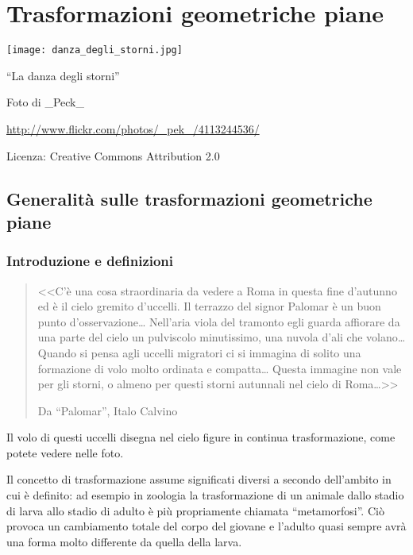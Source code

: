 \chapter{Trasformazioni geometriche piane}

\texttt{[image: danza\_degli\_storni.jpg]}
  \begin{center}
    {\large ``La danza degli storni''}\par
    Foto di \_Peck\_\par
    \url{http://www.flickr.com/photos/_pek_/4113244536/}\par
    Licenza: Creative Commons Attribution 2.0\par
  \end{center}
\newpage


\section{Generalità sulle trasformazioni geometriche piane}

\subsection{Introduzione e definizioni}

\begin{quote}
<<C'è una cosa straordinaria da vedere a Roma in questa fine d'autunno ed è il cielo gremito d'uccelli. Il terrazzo del signor Palomar è un buon punto d'osservazione\ldots{} Nell'aria viola del tramonto egli guarda affiorare da una parte del cielo un pulviscolo minutissimo, una nuvola d'ali che volano\ldots{} Quando si pensa agli uccelli migratori ci si immagina di solito una formazione di volo molto ordinata e compatta\ldots{} Questa immagine non vale per gli storni, o almeno per questi storni autunnali nel cielo di Roma\ldots{}>>

\hfill{}Da ``Palomar'', Italo Calvino
\end{quote}

Il volo di questi uccelli disegna nel cielo figure in continua trasformazione, come potete vedere nelle foto. 

Il concetto di trasformazione assume significati diversi a secondo dell'ambito in cui è definito: ad esempio in zoologia la trasformazione di un animale dallo stadio di larva allo stadio di adulto è più propriamente chiamata ``metamorfosi''. Ciò provoca un cambiamento totale del corpo del giovane e l'adulto quasi sempre avrà una forma molto differente da quella della larva.

